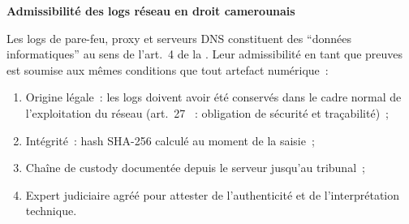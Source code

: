 \begin{boxjuris}
\textbf{Admissibilité des logs réseau en droit camerounais}

Les logs de pare-feu, proxy et serveurs DNS constituent des ``données
informatiques'' au sens de l'art.~4 de la .
Leur admissibilité en tant que preuves est soumise aux mêmes
conditions que tout artefact numérique~:
\begin{enumerate}
    \item Origine légale~: les logs doivent avoir été conservés dans
          le cadre normal de l'exploitation du réseau (art.~27
          ~: obligation de sécurité et traçabilité)~;
    \item Intégrité~: hash SHA-256 calculé au moment de la saisie~;
    \item Chaîne de custody documentée depuis le serveur jusqu'au
          tribunal~;
    \item Expert judiciaire agréé pour attester de l'authenticité
          et de l'interprétation technique.
\end{enumerate}
\end{boxjuris}

\separateur

